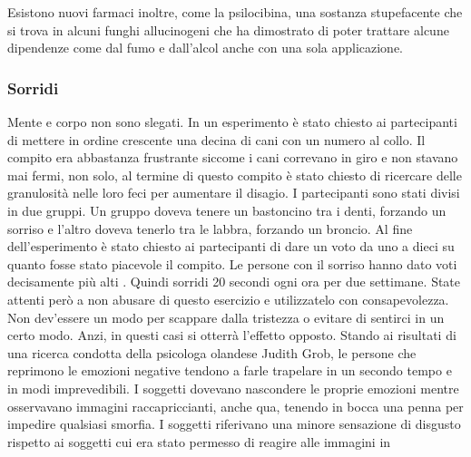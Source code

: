 \documentclass[12pt]{book} %
\begin{document}
Esistono nuovi farmaci inoltre, come la psilocibina, una sostanza stupefacente che si trova in alcuni funghi
allucinogeni che ha dimostrato di poter trattare alcune dipendenze come
dal fumo e dall'alcol anche con una sola
applicazione.

\subsubsection{Sorridi}
Mente e corpo non sono slegati. In un esperimento è stato chiesto ai partecipanti di mettere in ordine crescente una
decina di cani con un numero al collo. Il compito era abbastanza frustrante siccome i cani correvano in giro e non
stavano mai fermi, non solo, al termine di questo compito è stato chiesto di ricercare delle granulosità nelle loro
feci per aumentare il disagio. I partecipanti sono stati divisi in due gruppi. Un gruppo doveva tenere un bastoncino
tra i denti, forzando un sorriso e l'altro doveva tenerlo tra le labbra, forzando un broncio. Al
fine dell'esperimento è stato chiesto ai partecipanti di dare un voto da uno a dieci su quanto
fosse stato piacevole il compito. Le persone con il sorriso hanno dato voti decisamente più
alti   .
Quindi sorridi 20 secondi ogni ora per due settimane. State attenti però a non abusare di questo esercizio e utilizzatelo
con consapevolezza. Non dev'essere un modo per scappare dalla tristezza o evitare di sentirci in
un certo modo. Anzi, in questi casi si otterrà l'effetto opposto. Stando ai risultati di una
ricerca condotta della psicologa olandese Judith Grob, le persone che reprimono le emozioni negative tendono a farle
trapelare in un secondo tempo e in modi imprevedibili. I soggetti dovevano nascondere le proprie emozioni mentre
osservavano immagini raccapriccianti, anche qua, tenendo in bocca una penna per impedire qualsiasi smorfia. I soggetti
riferivano una minore sensazione di disgusto rispetto ai soggetti cui era stato permesso di reagire alle immagini in
\end{document}
